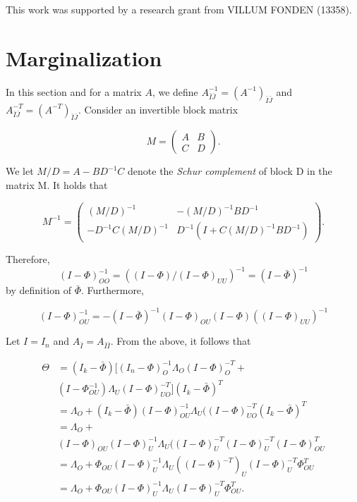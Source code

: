 \documentclass[accepted]{uai2021} %
\begin{document}
\begin{acknowledgements} %
    This work was supported by a research grant from
    VILLUM FONDEN (13358).
\end{acknowledgements}

\appendix

\section{Marginalization}
\label{sec:marg}

In this section and for a matrix $A$, we define $A_{\bar{I}\bar{J}}^{-1} = 
(A^{-1})_{\bar{I}\bar{J}}$ and 
$A_{\bar{I}\bar{J}}^{-T}=(A^{-T})_{\bar{I}\bar{J}}$. Consider an invertible 
block matrix 

$$
M=
\begin{pmatrix}
A & B \\
C & D
\end{pmatrix}.
$$

We let $M / D = A - BD^{-1}C$ denote the \emph{Schur complement} of block D in 
the matrix M. It holds that

$$
M^{-1}=
\begin{pmatrix}
(M/D)^{-1} & -(M/D)^{-1}BD^{-1} \\
-D^{-1}C(M/D)^{-1} & D^{-1}(I + C(M/D)^{-1}BD^{-1})
\end{pmatrix}.
$$

Therefore, $$(I - {\Phi})_{OO}^{-1} = ((I - {\Phi})/(I - 
{\Phi})_{UU})^{-1} = (I- \bar{\Phi})^{-1}$$ by definition of 
$\bar{\Phi}$. 
Furthermore, 

$$
(I-{\Phi})_{OU}^{-1} = 
-(I-\bar{\Phi})^{-1}(I-{\Phi})_{OU}(I-{\Phi})((I-{\Phi})_{UU})^{-1}
$$

Let $I = I_n$ and $A_{\bar{I}}=A_{\bar{I}\bar{I}}$. From the above, it 
follows 
that

\begin{align*}
\Theta & = (I_k - \bar{\Phi})[(I_n - 
{\Phi})_{O}^{-1}{\Lambda}_{O}(I - {\Phi})_{O}^{-T} + \\ 
&  
(I 
- 
{\Phi}_{OU}^{-1}){\Lambda}_{U}(I - 
{\Phi})_{UO}^{-T}](I_k - 
\bar{\Phi})^T \\
& = {\Lambda}_{O} + (I_k - \bar{\Phi})(I 
- 
{\Phi})_{OU}^{-1}{\Lambda}_{U}((I - 
{\Phi})_{UO}^{-T}(I_k - 
\bar{\Phi})^T \\
& = {\Lambda}_{O} + \\ & (I - {\Phi})_{OU}(I - 
{\Phi})_{U}^{-1}{\Lambda}_{U}((I - 
{\Phi})_{U}^{-T}(I - 
{\Phi})_{U}^{-T}(I - 
{\Phi})_{OU}^T \\
& = {\Lambda}_{O} + {\Phi}_{OU}(I - 
{\Phi})_{U}^{-1}{\Lambda}_{U}((I - 
{\Phi})^{-T})_{U}(I - 
{\Phi})_{U}^{-T} 
{\Phi}_{OU}^T \\
& = {\Lambda}_{O} + {\Phi}_{OU}(I - 
{\Phi})_{U}^{-1}{\Lambda}_{U} (I - 
{\Phi})_{U}^{-T}
{\Phi}_{OU}^T.
\end{align*}



\end{document}
